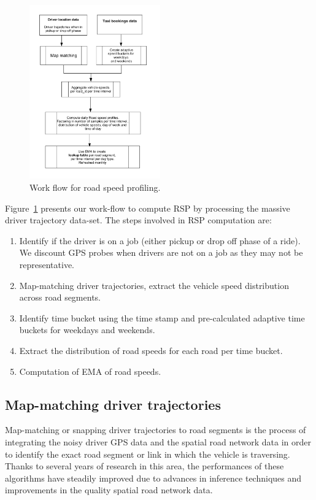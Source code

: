 \documentclass[conference]{IEEEtran}
\begin{document}
\begin{figure}[!tb]
	\centering
	\includegraphics[width=\columnwidth,left,height=7.5cm,keepaspectratio]{images/WorkFlowRSP.pdf}
	
	\caption{Work flow for road speed profiling.}
	\label{fig:workflow-rsp}
\end{figure}



Figure~\ref{fig:workflow-rsp} presents our work-flow to compute \ac{RSP} by processing the massive driver trajectory data-set. The steps involved in RSP computation are:
\begin{enumerate}
    \item Identify if the driver is on a job (either pickup or drop off phase of a ride). We discount GPS probes when drivers are not on a job as they may not be representative. 
    \item Map-matching driver trajectories, extract the vehicle speed distribution across road segments.
    \item Identify time bucket using the time stamp and pre-calculated adaptive time buckets for weekdays and weekends.
    \item Extract the distribution of road speeds for each road per time bucket.
    \item Computation of \ac{EMA} of road speeds.
\end{enumerate}


\subsection{Map-matching driver trajectories}
\label{subsec:snap-to-road}
Map-matching or snapping driver trajectories to road segments is the process of integrating the noisy driver GPS data and the spatial road network data in order to identify the exact road segment or link in which the vehicle is traversing. Thanks to several years of research in this area, the performances of these algorithms have steadily improved due to advances in inference techniques and improvements in the quality spatial road network data. 
\end{document}
